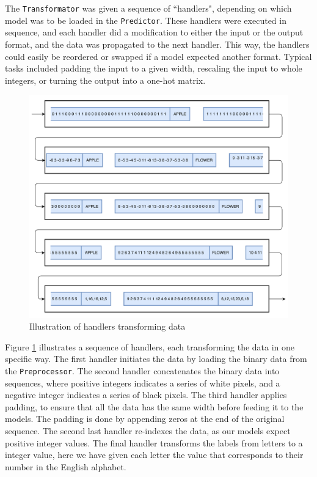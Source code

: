 The {\tt Transformator} was given a sequence of ``handlers", depending on which model was to be loaded in the {\tt Predictor}. These handlers were executed in sequence, and each handler did a modification to either the input or the output format, and the data was propagated to the next handler. This way, the handlers could easily be reordered or swapped if a model expected another format. Typical tasks included padding the input to a given width, rescaling the input to whole integers, or turning the output into a one-hot matrix.

\begin{figure}[h]
    \centering
    \includegraphics[width=1\textwidth]{fig/development_process/transformator.png}
    \caption{Illustration of handlers transforming data}
    \label{fig:development-transformator}
\end{figure}

Figure \ref{fig:development-transformator} illustrates a sequence of handlers, each transforming the data in one specific way. The first handler initiates the data by loading the binary data from the {\tt Preprocessor}. The second handler concatenates the binary data into sequences, where positive integers indicates a series of white pixels, and a negative integer indicates a series of black pixels. The third handler applies padding, to ensure that all the data has the same width before feeding it to the models. The padding is done by appending zeros at the end of the original sequence. The second last handler re-indexes the data, as our models expect positive integer values. The final handler transforms the labels from letters to a integer value, here we have given each letter the value that corresponds to their number in the English alphabet.

